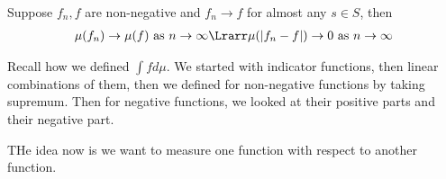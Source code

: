 \par\bigskip
\begin{lem}{}
  Suppose $f_n,f$ are non-negative and $f_n\to f$ for almost any $s\in S$, then
  \begin{equation*}
    \begin{gathered}
      \mu(f_n)\to \mu(f)\text{ as } n\to\infty \Lrarr \mu(\left|f_n-f\right|)\to0\text{ as } n\to\infty
    \end{gathered}
  \end{equation*}
\end{lem}
\par\bigskip
\noindent Recall how we defined $\int f d\mu$. We started with indicator functions, then linear combinations of them, then we defined for non-negative functions by taking supremum. Then for negative functions, we looked at their positive parts and their negative part.\par
\noindent THe idea now is we want to measure one function with respect to another function.
